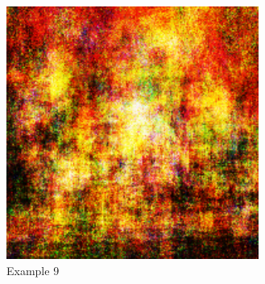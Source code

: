     \begin{figure}[htb!] 
    	\centering
    	\includegraphics[width=0.7\linewidth]{15500-3.pdf}
    	\caption{Example 9}
    	\label{fig:15500-3}
    \end{figure} 

